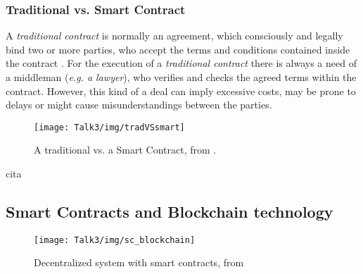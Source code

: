 \subsubsection{Traditional vs. Smart Contract}
A \textit{traditional contract} is normally an agreement, which consciously and legally bind two or more parties, who accept the terms and conditions contained inside the contract \cite{SC12,SC13}. For the execution of a \textit{traditional contract} there is always a need of a middleman (\textit{e.g. a lawyer}), who verifies and checks the agreed terms within the contract. However, this kind of a deal can imply excessive costs, may be prone to delays or might cause misunderstandings between the parties. 

           \begin{figure}[H]
         \begin{center}
         \texttt{[image: Talk3/img/tradVSsmart]}
         \end{center}
         \caption{A traditional vs. a Smart Contract, from \cite{SC2}.}
         \label{label}
       \end{figure}
cita\cite{SC2}











\subsection{Smart Contracts and Blockchain technology}
           \begin{figure}[H]
         \begin{center}
         \texttt{[image: Talk3/img/sc\_blockchain]}
         \end{center}
         \caption{Decentralized system with smart contracts, from \cite{paper3}}
         \label{label}
       \end{figure}

